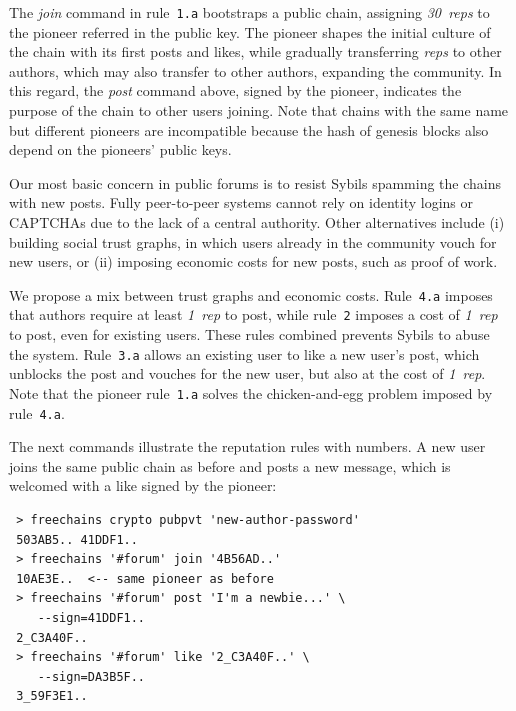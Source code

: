 \documentclass[10pt,journal,compsoc]{IEEEtran}
\newcommand{\reps}     {\emph{reps}\xspace}
\newcommand{\onerep}   {\emph{1~rep}\xspace}
\newcommand{\nreps}[1] {\emph{#1~reps\xspace}}
\begin{document}
The \emph{join} command in rule~\texttt{1.a} bootstraps a public chain,
assigning \nreps{30} to the pioneer referred in the public key.
The pioneer shapes the initial culture of the chain with its first posts and
likes, while gradually transferring \reps to other authors, which may also
transfer to other authors, expanding the community.
%
In this regard, the \emph{post} command above, signed by the pioneer, indicates
the purpose of the chain to other users joining.
%
Note that chains with the same name but different pioneers are incompatible
because the hash of genesis blocks also depend on the pioneers' public keys.

Our most basic concern in public forums is to resist Sybils spamming the chains
with new posts.
Fully peer-to-peer systems cannot rely on identity logins or CAPTCHAs due
to the lack of a central authority.
Other alternatives include (i) building social trust graphs, in which users
already in the community vouch for new users, or (ii) imposing economic costs
for new posts, such as proof of work.

We propose a mix between trust graphs and economic costs.
Rule~\texttt{4.a} imposes that authors require at least \onerep to post, while
rule~\texttt{2} imposes a cost of \onerep to post, even for existing users.
These rules combined prevents Sybils to abuse the system.
Rule~\texttt{3.a} allows an existing user to like a new user's post, which
unblocks the post and vouches for the new user, but also at the cost of
\onerep.
%
Note that the pioneer rule~\texttt{1.a} solves the chicken-and-egg problem
imposed by rule~\texttt{4.a}.

The next commands illustrate the reputation rules with numbers.
A new user joins the same public chain as before and posts a new message, which
is welcomed with a like signed by the pioneer:

{\footnotesize
\begin{verbatim}
 > freechains crypto pubpvt 'new-author-password'
 503AB5.. 41DDF1..
 > freechains '#forum' join '4B56AD..'
 10AE3E..  <-- same pioneer as before
 > freechains '#forum' post 'I'm a newbie...' \
    --sign=41DDF1..
 2_C3A40F..
 > freechains '#forum' like '2_C3A40F..' \
    --sign=DA3B5F..
 3_59F3E1..
\end{verbatim}
}
\end{document}
